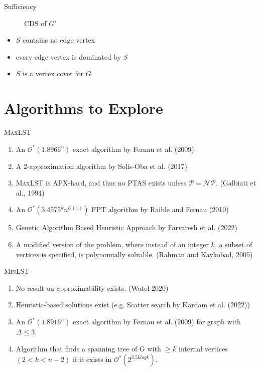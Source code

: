 \documentclass{beamer}
\begin{document}
\begin{frame}{Sufficiency}
\begin{figure}
      \caption{\textsc{CDS} of $G'$}
\end{figure}
    \begin{itemize}[<+->]
        \item $S$ contains no edge vertex
        \item every edge vertex is dominated by $S$
        \item $S$ is a vertex cover for $G$
    \end{itemize}
\end{frame}



\section{Algorithms to Explore}

\begin{frame}{\textsc{MaxLST}}
    \begin{enumerate}
        \item<1->An $\mathcal{O}^*(1.8966^n)$ exact algorithm by  Fernau et al. (2009)
        \item<2->A $2$-approximation algorithm by Solis-Oba et al. (2017) 
        \item<3->\textsc{MaxLST} is APX-hard, and thus no PTAS exists unless $\mathcal{P}=\mathcal{NP}$. (Galbiati et al., 1994)
        \item<4->An $\mathcal{O}^*(3.4575^kn^{\mathcal{O}(1)})$ FPT algorithm by Raible and Fernau (2010)
        \item<5->Genetic Algorithm Based Heuristic Approach by Farvaresh et al. (2022)
        \item<6->A modified version of the problem, where instead of an integer $k$, a subset of vertices is specified, is polynomially solvable. (Rahman and Kaykobad, 2005)
    \end{enumerate}
\end{frame}
\begin{frame}{\textsc{MinLST}}
    \begin{enumerate}
        \item<1-> No result on approximability exists. (Watel 2020) 
        \item<2-> Heuristic-based solutions exist (e.g. Scatter search by Kardam et al. (2022))
        \item<3->An $\mathcal{O}^*(1.8916^n)$ exact algorithm by  Fernau et al. (2009) for graph with $\Delta \leq 3$.  
        \item<4-> Algorithm that finds a spanning tree of G with $\geq k$ internal vertices  $(2 < k < n-2)$ if it exists in $\mathcal{O}^*(2^{3.5klogk})$.
    \end{enumerate}
\end{frame}
\end{document}
